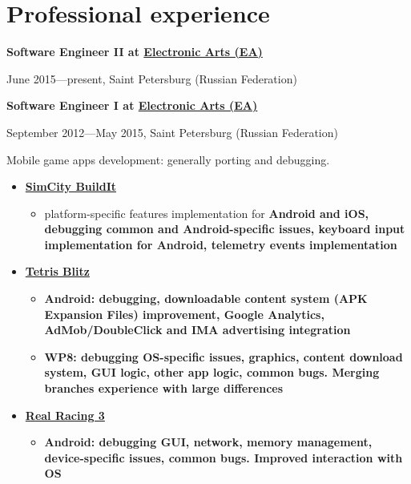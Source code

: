 \section{Professional experience}
{
\fontsize{12pt}{12pt}\selectfont
\bfseries Software Engineer II at
\href{http://www.ea.com}{Electronic Arts (EA)}
\mdseries
}

{
\fontsize{9pt}{8pt}\selectfont
June 2015---present, Saint Petersburg (Russian Federation)
}
\vspace{5pt}

{
\fontsize{12pt}{12pt}\selectfont
\bfseries Software Engineer I at
\href{http://www.ea.com}{Electronic Arts (EA)}
\mdseries
}

{
\fontsize{9pt}{8pt}\selectfont
September 2012---May 2015, Saint Petersburg (Russian Federation)
}

\subitem Mobile game apps development: generally porting and debugging.
\begin{itemize}
\setlength{\itemindent}{20pt}
\item
    \href{http://www.ea.com/simcity-buildit}
        {\bfseries SimCity BuildIt\mdseries}
    \begin{itemize}
        \item platform-specific features implementation for \bfseries Android \mdseries and \bfseries iOS\mdseries,
    debugging common and Android-specific issues,
    keyboard input implementation for Android,
    telemetry events implementation
    \end{itemize}
\item
    \href{http://www.tetrisblitz.com}
        {\bfseries Tetris Blitz \mdseries}
    \begin{itemize}
        \item \bfseries Android\mdseries:
        debugging,
        downloadable content system (APK Expansion Files) improvement,
        Google Analytics, AdMob/DoubleClick and IMA advertising integration
    \end{itemize}
    \begin{itemize}
        \item \bfseries WP8\mdseries:
        debugging OS-specific issues,
        graphics,
        content download system,
        GUI logic,
        other app logic,
        common bugs.
        Merging branches experience with large differences
    \end{itemize}
\item
    \href{http://www.ea.com/real-racing-3}
    {\bfseries Real Racing 3\mdseries}
    \begin{itemize}
        \item\bfseries Android\mdseries:
        debugging GUI,
        network,
        memory management,
        device-specific issues,
        common bugs.
        Improved interaction with OS
    \end{itemize}
\end{itemize}


